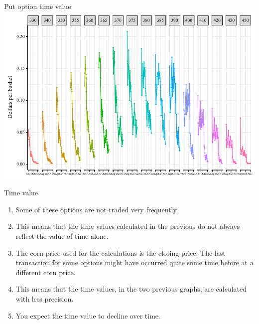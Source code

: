 \documentclass[table,xcolor=pdftex,dvipsnames]{beamer}\usepackage[]{graphicx}\usepackage[]{color}
\makeatletter
\def\maxwidth{ %
  \ifdim\Gin@nat@width>\linewidth
    \linewidth
  \else
    \Gin@nat@width
  \fi
}
\newenvironment{knitrout}{}{} %
\makeatother
\begin{document}

\begin{frame}{Put option time value}
\begin{knitrout}
\color{fgcolor}
\includegraphics[width=\maxwidth]{figure/put_time-1} 

\end{knitrout}
\end{frame}


\begin{frame}{Time value}
\begin{enumerate}[label=\textbullet]
  \item Some of these options are not traded very frequently.
  \item This means that the time values calculated in the previous do not always reflect the value of time alone.
  \item The corn price used for the calculations is the closing price. The last transaction for some options might have occurred quite some time before at a different corn price.
  \item This means that the time values, in the two previous graphs, are calculated with less precision.
  \item You expect the time value to decline over time.
\end{enumerate}
\end{frame}

\end{document}
